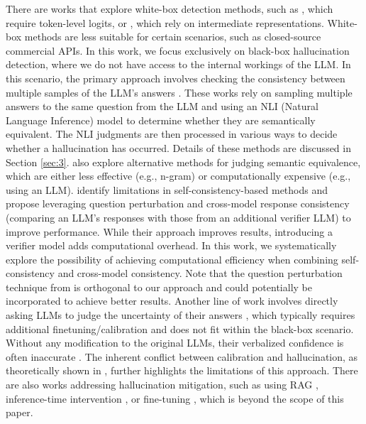 There are works that explore white-box detection methods, such as \cite{duan2024shifting,varshney2023stitch}, which require token-level logits, or \cite{yin2024characterizing,zou2023representation,agrawal2023language}, which rely on intermediate representations. White-box methods are less suitable for certain scenarios, such as closed-source commercial APIs. In this work, we focus exclusively on black-box hallucination detection, where we do not have access to the internal workings of the LLM. In this scenario, the primary approach involves checking the consistency between multiple samples of the LLM's answers \cite{manakul2023selfcheckgpt,farquhar2024detecting,kuhn2023semantic,lin2023generating,nikitin2024kernel}. These works rely on sampling multiple answers to the same question from the LLM and using an NLI (Natural Language Inference) model to determine whether they are semantically equivalent. The NLI judgments are then processed in various ways to decide whether a hallucination has occurred. Details of these methods are discussed in Section \ref{sec:3}. \citet{manakul2023selfcheckgpt,kuhn2023semantic} also explore alternative methods for judging semantic equivalence, which are either less effective (e.g., n-gram) or computationally expensive (e.g., using an LLM). \cite{SAC3_hallucination_detection_black_box_lms} identify limitations in self-consistency-based methods and propose leveraging question perturbation and cross-model response consistency (comparing an LLM's responses with those from an additional verifier LLM) to improve performance. While their approach improves results, introducing a verifier model adds computational overhead. In this work, we systematically explore the possibility of achieving computational efficiency when combining self-consistency and cross-model consistency. Note that the question perturbation technique from \cite{SAC3_hallucination_detection_black_box_lms} is orthogonal to our approach and could potentially be incorporated to achieve better results. Another line of work involves directly asking LLMs to judge the uncertainty of their answers \cite{mielke2022reducing,tian2023just,kadavath2022language,lin2022teaching}, which typically requires additional finetuning/calibration and does not fit within the black-box scenario. Without any modification to the original LLMs, their verbalized confidence is often inaccurate \cite{xiong2023can}. The inherent conflict between calibration and hallucination, as theoretically shown in \cite{calibrated_language_models_must_hallucinate}, further highlights the limitations of this approach. There are also works addressing hallucination mitigation, such as using RAG \cite{asai2023self,gao2022rarr}, inference-time intervention \cite{li2024inference}, or fine-tuning \cite{lee2022factuality,tian2023fine}, which is beyond the scope of this paper.



